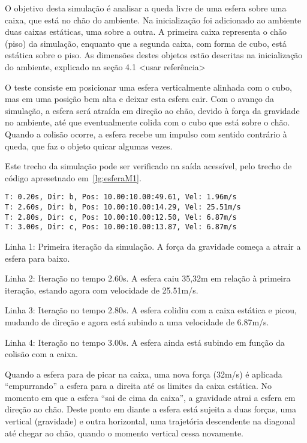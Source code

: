 \documentclass[12pt]{article}
\begin{document}
O objetivo desta simulação é analisar a queda livre de uma esfera sobre uma caixa, que está no chão do ambiente. Na inicialização foi adicionado ao ambiente duas caixas estáticas, uma sobre a outra. A primeira caixa representa o chão (piso) da simulação, enquanto que a segunda caixa, com forma de cubo, está estática sobre o piso. As dimensões destes objetos estão descritas na inicialização do ambiente, explicado na seção 4.1 <usar referência>

O teste consiste em posicionar uma esfera verticalmente alinhada com o cubo, mas em uma posição bem alta e deixar esta esfera cair. Com o avanço da simulação, a esfera será atraída em direção ao chão, devido à força da gravidade no ambiente, até que eventualmente colida com o cubo que está sobre o chão. Quando a colisão ocorre, a esfera recebe um impulso com sentido contrário à queda, que faz o objeto quicar algumas vezes. 

Este trecho da simulação pode ser verificado na saída acessível, pelo trecho de código apresetnado em~\ref{lg:esferaM1}. 

\begin{lstlisting}[frame=single,caption=Inicialização do ambiente\label{lg:esferaM1}]
T: 0.20s, Dir: b, Pos: 10.00:10.00:49.61, Vel: 1.96m/s
T: 2.60s, Dir: b, Pos: 10.00:10.00:14.29, Vel: 25.51m/s
T: 2.80s, Dir: c, Pos: 10.00:10.00:12.50, Vel: 6.87m/s
T: 3.00s, Dir: c, Pos: 10.00:10.00:13.87, Vel: 6.87m/s
\end{lstlisting}

Linha 1:  Primeira iteração da simulação. A força da gravidade começa a atrair a esfera para baixo.

Linha 2: Iteração no tempo 2.60s. A esfera caiu 35,32m em relação à primeira iteração, estando agora com velocidade de 25.51m/s.

Linha 3: Iteração no tempo 2.80s. A esfera colidiu com a caixa estática e picou, mudando de direção e agora está subindo a uma velocidade de 6.87m/s. 

Linha 4: Iteração no tempo 3.00s. A esfera ainda está subindo em função da colisão com a caixa.

Quando a esfera para de picar na caixa, uma nova força (32m/s) é aplicada “empurrando” a esfera para a direita até os limites da caixa estática.  No momento em que a esfera “sai de cima da caixa”, a gravidade atrai a esfera em direção ao chão. Deste ponto em diante a esfera está sujeita a duas forças, uma vertical (gravidade) e outra horizontal, uma trajetória descendente na diagonal até chegar ao chão, quando o momento vertical cessa novamente.
\end{document}
